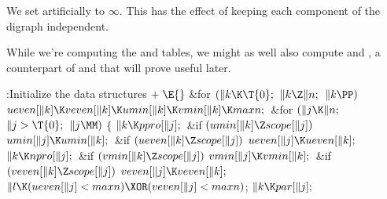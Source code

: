 We set  artificially to $\infty$. This has the effect of
keeping each component of the digraph independent.

While we're computing the  and  tables, we might as
well
also compute  and , a counterpart of 
and  that
will prove useful later.

\Y\B\4:Initialize the data structures\X${}\mathrel+\E{}$\6
\&{for} ${}(\|k\K\T{0};{}$ ${}\|k\Z\|n;{}$ ${}\|k\PP){}$\1\5
${}\\{ueven}[\|k]\K\\{veven}[\|k]\K\\{umin}[\|k]\K\\{vmin}[\|k]\K\\{maxn};{}$\2%
\6
\&{for} ${}(\|j\K\|n;{}$ ${}\|j>\T{0};{}$ ${}\|j\MM){}$\5
${}\{{}$\1\6
${}\|k\K\\{ppro}[\|j];{}$\6
\&{if} ${}(\\{umin}[\|k]\Z\\{scope}[\|j]){}$\1\5
${}\\{umin}[\|j]\K\\{umin}[\|k];{}$\2\6
\&{if} ${}(\\{ueven}[\|k]\Z\\{scope}[\|j]){}$\1\5
${}\\{ueven}[\|j]\K\\{ueven}[\|k];{}$\2\6
${}\|k\K\\{npro}[\|j];{}$\6
\&{if} ${}(\\{vmin}[\|k]\Z\\{scope}[\|j]){}$\1\5
${}\\{vmin}[\|j]\K\\{vmin}[\|k];{}$\2\6
\&{if} ${}(\\{veven}[\|k]\Z\\{scope}[\|j]){}$\1\5
${}\\{veven}[\|j]\K\\{veven}[\|k];{}$\2\6
${}\|l\K(\\{ueven}[\|j]<\\{maxn})\XOR(\\{veven}[\|j]<\\{maxn}){}$;\6
${}\|k\K\\{par}[\|j];{}$\6
